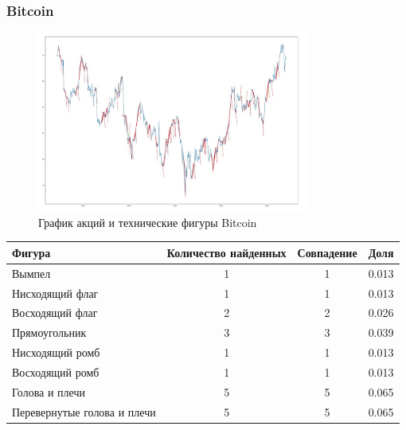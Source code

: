 \documentclass[bachelor, och, coursework]{SCWorks}
\begin{document}
        \subsubsection{Bitcoin}
    
        \begin{figure}[H]
            \centering
            \includegraphics[width=0.8\textwidth]{pic/BTC.jpg}
            \caption{График акций и технические фигуры Bitcoin}
        \end{figure}
       
        \begin{table}[!hbt]
            \centering
            \begin{tabular}{|l|c|c|c|}
            \hline
            Фигура                      & \multicolumn{1}{l|}{Количество найденных} & Совпадение & Доля  \\ \hline
            Вымпел                      & 1                                         & 1          & 0.013 \\ \hline
            Нисходящий флаг             & 1                                         & 1          & 0.013 \\ \hline
            Восходящий флаг             & 2                                         & 2          & 0.026 \\ \hline
            Прямоугольник               & 3                                         & 3          & 0.039 \\ \hline
            Нисходящий ромб             & 1                                         & 1          & 0.013 \\ \hline
            Восходящий ромб             & 1                                         & 1          & 0.013 \\ \hline
            Голова и плечи              & 5                                         & 5          & 0.065 \\ \hline
            Перевернутые голова и плечи & 5                                         & 5          & 0.065 \\ \hline
            \end{tabular}
            \end{table}
        
\end{document}
